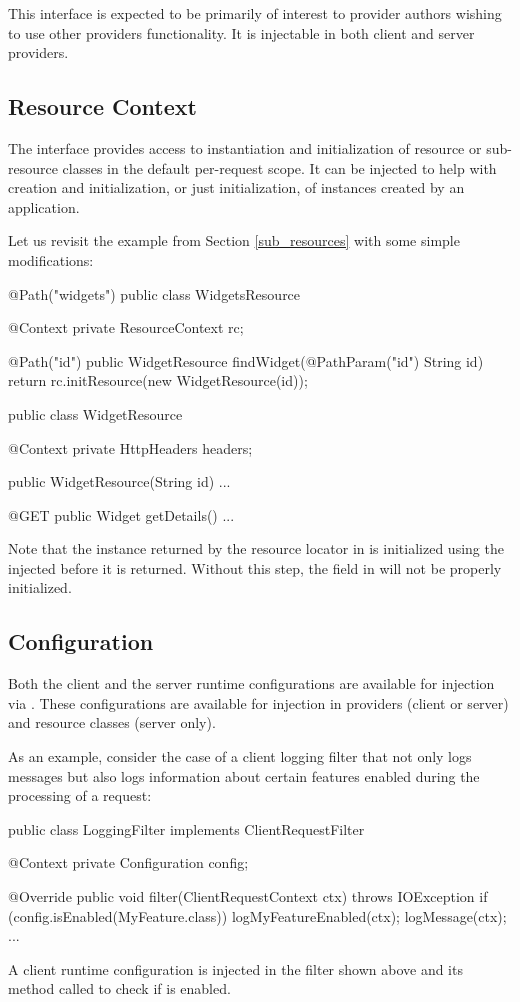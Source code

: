 This interface is expected to be primarily of interest to provider authors wishing to use other providers functionality. It is injectable in both client and server providers.

\subsection{Resource Context}
\label{resource_context}

The  interface provides access to instantiation and initialization of resource or sub-resource classes in the default per-request scope. It can be injected to help with creation and initialization, or just initialization, of instances created by an application.

Let us revisit the example from Section \ref{sub_resources} with some simple modifications:

\begin{listing}{1}
@Path("widgets")
public class WidgetsResource {
  @Context 
  private ResourceContext rc;
  
  @Path("{id}")
  public WidgetResource findWidget(@PathParam("id") String id) {
    return rc.initResource(new WidgetResource(id));
  }
}

public class WidgetResource {
  @Context 
  private HttpHeaders headers;

  public WidgetResource(String id) {...}

  @GET
  public Widget getDetails() {...}
}
\end{listing}

Note that the instance returned by the resource locator  in  is initialized using the injected  before it is returned. Without this step, the  field in  will not be properly initialized.

\subsection{Configuration}
\label{configuration_injection}

Both the client and the server runtime configurations are available for injection via \Context. These configurations are available for injection in providers (client or server) and resource classes (server only). 

As an example, consider the case of a client logging filter that not only logs messages but also logs information about certain features enabled during the processing of a request:

\begin{listing}{1}
public class LoggingFilter implements ClientRequestFilter {

  @Context
  private Configuration config;

  @Override
  public void filter(ClientRequestContext ctx) throws IOException {
    if (config.isEnabled(MyFeature.class)) {
      logMyFeatureEnabled(ctx);
    }
    logMessage(ctx);
  }
  ...
}
\end{listing}

A client runtime configuration is injected in the filter shown above and its  method called to check if  is enabled.
